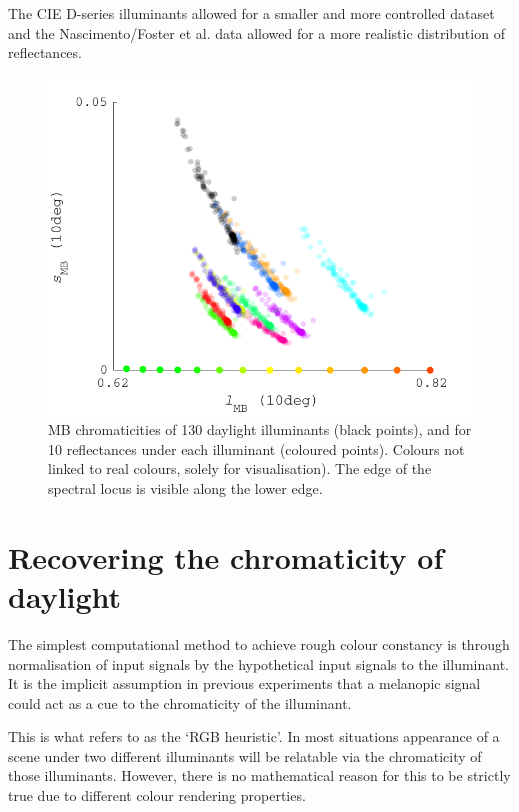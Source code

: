 The CIE D-series illuminants allowed for a smaller and more controlled dataset and the Nascimento/Foster et al. data allowed for a more realistic distribution of reflectances.

\begin{figure}[htbp]
    \includegraphics[max width=\textwidth]{figs/comp/predictingChromaticity/BasicMB_2.pdf}
    \caption{\gls{MB} chromaticities of 130 daylight illuminants (black points), and for 10 reflectances under each illuminant (coloured points). Colours not linked to real colours, solely for visualisation). The edge of the spectral locus is visible along the lower edge.}
    \label{fig:MB}
\end{figure} 


\section{Recovering the chromaticity of daylight}

The simplest computational method to achieve rough colour constancy is through normalisation of input signals by the hypothetical input signals to the illuminant. It is the implicit assumption in previous experiments that a melanopic signal could act as a cue to the chromaticity of the illuminant.

This is what \citet{maloney_physics-based_2001} refers to as the `RGB heuristic'. In most situations appearance of a scene under two different illuminants will be relatable via the chromaticity of those illuminants. However, there is no mathematical reason for this to be strictly true due to different colour rendering properties.

